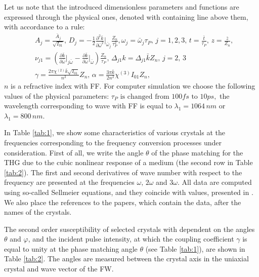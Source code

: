 \documentclass[a4paper, 12pt, onecolumn]{extarticle}
\begin{document}
 Let us note that the introduced dimensionless parameters and functions are expressed through the physical ones, denoted with containing line above them, with accordance to a rule:
\begin{equation}
\label{eq:pars}
\begin{aligned}
&A_j=\frac{\bar{A}_j}{\sqrt{I_{01}}},\,D_j=-\frac{1}{2}\frac{\partial^2 \bar{k}}{\partial \bar{\omega}^2}\Big|_{\bar{\omega}_j}\frac{Z_n}{\tau_P^2},\omega_j=\bar{\omega}_j\tau_P,\,j=1,2,3,\,t=\frac{\bar{t}}{\tau_P},\,z=\frac{\bar{z}}{Z_n},\\
&\nu_{j1}=\left(\frac{\partial \bar{k}}{\partial \bar{\omega}}\Big|_{j\bar{\omega}}-\frac{\partial \bar{k}}{\partial \bar{\omega}}\Big|_{\bar{\omega}}\right)\frac{Z_n}{\tau_P},\,\Delta_{j1}k=\Delta_{j1}\bar{k}Z_n,\,j=2,\,3\\
&\gamma=\frac{2\pi\chi^{(2)}\bar{k}\sqrt{I_{01}}}{n^2}Z_n,\,\alpha=\frac{3\pi \bar{k}}{2n^2}\chi^{(3)}I_{01} Z_n,
\end{aligned}
\end{equation}
$n$ is a refractive index with FF. For computer simulation we choose the following values of the physical parameters: \(\tau_P \text{ is changed from } 100fs\text{ to }10ps,\) the wavelength corresponding to wave with FF is equal to \(\lambda_1=1064\,nm\) or \(\lambda_1=800\,nm\). 

In Table \ref{tab:1}, we show some characteristics of various crystals at the frequencies corresponding to the frequency conversion processes under consideration. First of all, we write the angle \(\theta\) of the phase matching for the THG due to the cubic nonlinear response of a medium (the second row in Table \ref{tab:2}). The first and second derivatives of wave number with respect to the frequency are presented at the frequencies \(\omega,\, 2\omega\) and \(3\omega\). All data are computed using so-called Sellmeier equations, and they coincide with values, presented in \cite{bib:ri}. We also place the references to the papers, which contain the data, after the names of the crystals. 

The second order susceptibility of selected crystals with dependent on the angles \(\theta\) and \(\varphi\), and the incident pulse intensity, at which the coupling coefficient \(\gamma\) is equal to unity at the phase matching angle \(\theta\) (see Table \ref{tab:1}), are shown in Table \ref{tab:2}. The angles are measured between the crystal axis in the uniaxial crystal and wave vector of the FW.
\end{document}
